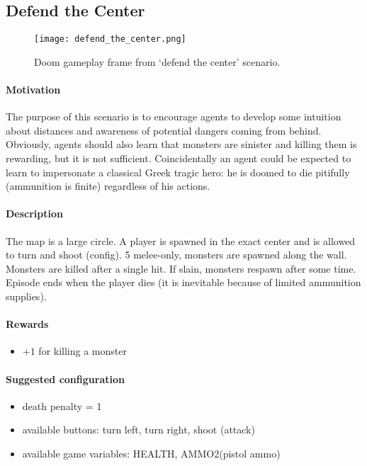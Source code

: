 	\subsection{Defend the Center}\label{subsec:defend_the_center}
		\begin{figure}
			\centering
			\texttt{[image: defend\_the\_center.png]}
			\caption{Doom gameplay frame from `defend the center' scenario.}\label{fig:defend_the_center}
		\end{figure}
		\paragraph{Motivation} 
			The purpose of this scenario is to encourage agents to develop some intuition about distances and awareness of potential dangers coming from behind. Obviously, agents should also learn that monsters are sinister and killing them is rewarding, but it is not sufficient. Coincidentally an agent could be expected to learn to impersonate a classical Greek tragic hero: he is doomed to die pitifully (ammunition is finite) regardless of his actions.

		\paragraph{Description}
			The map is a large circle. A player is spawned in the exact center and is allowed to turn and shoot (config). 5 melee-only, monsters are spawned along the wall. Monsters are killed after a single hit. If slain, monsters respawn after some time. Episode ends when the player dies (it is inevitable because of limited ammunition supplies).

		\paragraph{Rewards}
			\begin{itemize}
				\item $+1$ for killing a monster
			\end{itemize}
		
		\paragraph{Suggested configuration}
			\begin{itemize}
				\item death penalty = 1
				\item available buttons: turn left, turn right, shoot (attack)
				\item available game variables: HEALTH, AMMO2(pistol ammo)
			\end{itemize}
	\newpage

